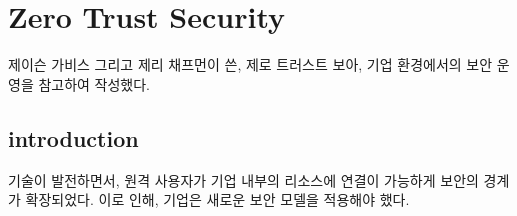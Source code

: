 \chapter{Zero Trust Security}

제이슨 가비스 그리고 제리 채프먼이 쓴, 제로 트러스트 보아, 기업 환경에서의 보안
운영을 참고하여 작성했다.

\section{introduction}

기술이 발전하면서, 원격 사용자가 기업 내부의 리소스에 연결이 가능하게 보안의 경계가 확장되었다.
이로 인해, 기업은 새로운 보안 모델을 적용해야 했다.

